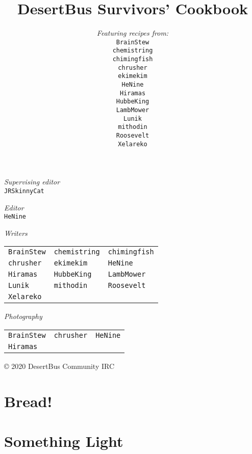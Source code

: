 \documentclass[12pt,a4paper,twoside]{book}
\title{DesertBus Survivors' Cookbook}
\author{\textit{Featuring recipes from:}\\
		\texttt{BrainStew}\\%
		\texttt{chemistring}\\%
		\texttt{chimingfish}\\%
		\texttt{chrusher}\\%
		\texttt{ekimekim}\\%
		\texttt{HeNine}\\%
		\texttt{Hiramas}\\%
		\texttt{HubbeKing}\\%
		\texttt{LambMower}\\%
		\texttt{Lunik}\\%
		\texttt{mithodin}\\%
		\texttt{Roosevelt}\\%
		\texttt{Xelareko}
}
\begin{document}
	\frontmatter
	\maketitle

	\newpage

	\null
	\vfill

	\textit{Supervising editor}\\
	\texttt{JRSkinnyCat}

	\textit{Editor}\\
	\texttt{HeNine}


	\textit{Writers}\\
	\hspace*{-0.45em}\begin{tabular}{lll}
	\texttt{BrainStew} &
	\texttt{chemistring} &
	\texttt{chimingfish}\\
	\texttt{chrusher} &
	\texttt{ekimekim} &
	\texttt{HeNine}\\
	\texttt{Hiramas} &
	\texttt{HubbeKing} &
	\texttt{LambMower}\\
	\texttt{Lunik} &
	\texttt{mithodin} &
	\texttt{Roosevelt}\\
	\texttt{Xelareko}&&
	\end{tabular}

	\textit{Photography}\\
	\hspace*{-0.45em}\begin{tabular}{lll}
		\texttt{BrainStew} &
		\texttt{chrusher} &
		\texttt{HeNine}\\
		\texttt{Hiramas}&&
	\end{tabular}

	\vspace{1in}
	© 2020 DesertBus Community IRC

	\newpage
	\newpage
	\tableofcontents
	\clearpage

	\mainmatter
	\chapter{Bread!}
	\clearpage

	
	\clearpage
	
	\clearpage
	
	\clearpage

	\chapter{Something Light}
	\clearpage
\end{document}
